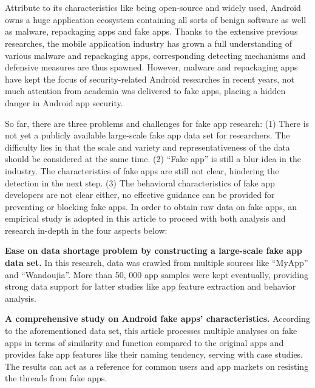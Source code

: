 \newpage
\cleardoublepage{}

\chapter*{}
\vspace{-5mm}


Attribute to its characteristics like being open-source and widely used, Android owns a huge application ecosystem containing all sorts of benign software as well as malware, repackaging apps and fake apps.
Thanks to the extensive previous researches, the mobile application industry has grown a full understanding of various malware and repackaging apps, corresponding detecting mechanisms and defensive measures are thus spawned.
However, malware and repackaging apps have kept the focus of security-related Android researches in recent years, not much attention from academia was delivered to fake apps, placing a hidden danger in Android app security.

So far, there are three problems and challenges for fake app research:
(1) There is not yet a publicly available large-scale fake app data set for researchers. The difficulty lies in that the scale and variety and representativeness of the data should be considered at the same time.
(2) ``Fake app'' is still a blur idea in the industry. The characteristics of fake apps are still not clear,  hindering the detection in the next step.
(3) The behavioral characteristics of fake app developers are not clear either, no effective guidance can be provided for preventing or blocking fake apps.
In order to obtain raw data on fake apps, an empirical study is adopted in this article to proceed with both analysis and research in-depth in the four aspects below:


\textbf{Ease on data shortage problem by constructing a large-scale fake app data set. }
In this research, data was crawled from multiple sources like ``MyApp'' and ``Wandoujia''.
More than 50, 000 app samples were kept eventually, providing strong data support for latter studies like app feature extraction and behavior analysis.

\textbf{A comprehensive study on Android fake apps' characteristics. }
According to the aforementioned data set, this article processes multiple analyses on fake apps in terms of similarity and function compared to the original apps and provides fake app features like their naming tendency, serving with case studies.
The results can act as a reference for common users and app markets on resisting the threads from fake apps.

